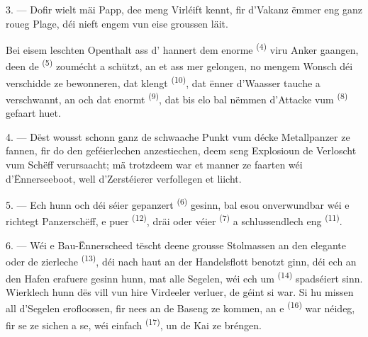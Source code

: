 3. --- Dofir wielt mäi Papp, dee meng Virléift kennt, fir d'Vakanz ëmmer eng ganz
roueg Plage, déi nieft engem vun eise groussen  läit.

Bei eisem leschten Openthalt ass d' hannert dem enorme 
\textsuperscript{(4)} viru Anker gaangen, deen de 
\textsuperscript{(5)} zoumécht a schützt, an et ass mer gelongen, no mengem Wonsch
déi verschidde  ze bewonneren, dat klengt
 \textsuperscript{(10)}, dat ënner d'Waasser tauche a
verschwannt, an och dat enormt  \textsuperscript{(9)}, dat bis
elo bal nëmmen d'Attacke vum  \textsuperscript{(8)} gefaart huet.

\VUsaut{3.0mm}
\VUsaut{3.0mm}

4. --- Dëst wousst schonn ganz  de schwaache Punkt vum décke
Metallpanzer ze fannen, fir do den geféierlechen  anzestiechen, deem
seng Explosioun de Verloscht vum Schëff verursaacht; mä trotzdeem war et manner ze
faarten wéi d'Ënnerseeboot, well d'Zerstéierer verfollegen et liicht.

5. --- Ech hunn och déi séier gepanzert  \textsuperscript{(6)}
gesinn, bal esou onverwundbar wéi e richtegt Panzerschëff, e puer
 \textsuperscript{(12)}, dräi oder véier
 \textsuperscript{(7)} a schlussendlech eng 
\textsuperscript{(11)}. 

6. --- Wéi e Bau-Ënnerscheed tëscht deene grousse Stolmassen an den elegante
 oder de zierleche 
\textsuperscript{(13)}, déi nach haut an der Handelsflott benotzt ginn, déi ech an den
Hafen erafuere gesinn hunn, mat alle Segelen, wéi ech um 
\textsuperscript{(14)} spadséiert sinn. Wierklech hunn dës vill vun hire Virdeeler
verluer,  de  géint si war. Si hu missen all d'Segelen
erofloossen, fir nees an de Baseng ze kommen, an e 
\textsuperscript{(16)} war néideg, fir se ze sichen a se, wéi einfach
 \textsuperscript{(17)}, un de Kai ze bréngen.

\VUsaut{3.0mm}
\VUsaut{3.0mm}

